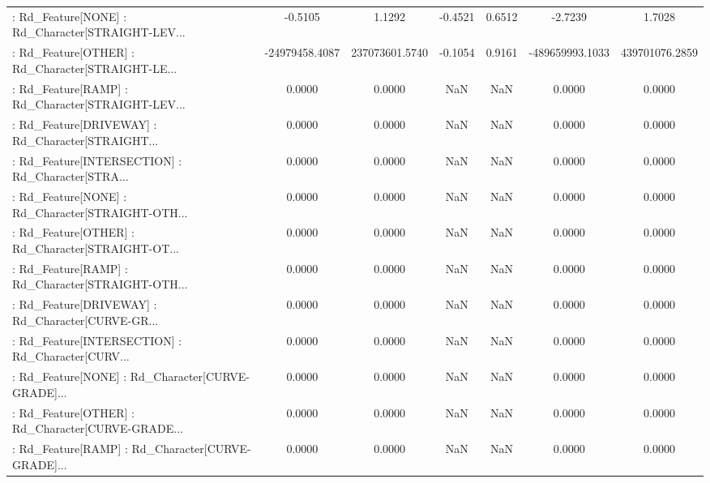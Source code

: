 \begin{longtable}{p{4cm}cccccc}
 : Rd\_Feature[NONE] : Rd\_Character[STRAIGHT-LEV... &           -0.5105 &            1.1292 & -0.4521 &       0.6512 &            -2.7239 &            1.7028 \\
 : Rd\_Feature[OTHER] : Rd\_Character[STRAIGHT-LE... &    -24979458.4087 &    237073601.5740 & -0.1054 &       0.9161 &    -489659993.1033 &    439701076.2859 \\
 : Rd\_Feature[RAMP] : Rd\_Character[STRAIGHT-LEV... &            0.0000 &            0.0000 &     NaN &          NaN &             0.0000 &            0.0000 \\
 : Rd\_Feature[DRIVEWAY] : Rd\_Character[STRAIGHT... &            0.0000 &            0.0000 &     NaN &          NaN &             0.0000 &            0.0000 \\
 : Rd\_Feature[INTERSECTION] : Rd\_Character[STRA... &            0.0000 &            0.0000 &     NaN &          NaN &             0.0000 &            0.0000 \\
 : Rd\_Feature[NONE] : Rd\_Character[STRAIGHT-OTH... &            0.0000 &            0.0000 &     NaN &          NaN &             0.0000 &            0.0000 \\
 : Rd\_Feature[OTHER] : Rd\_Character[STRAIGHT-OT... &            0.0000 &            0.0000 &     NaN &          NaN &             0.0000 &            0.0000 \\
 : Rd\_Feature[RAMP] : Rd\_Character[STRAIGHT-OTH... &            0.0000 &            0.0000 &     NaN &          NaN &             0.0000 &            0.0000 \\
 : Rd\_Feature[DRIVEWAY] : Rd\_Character[CURVE-GR... &            0.0000 &            0.0000 &     NaN &          NaN &             0.0000 &            0.0000 \\
 : Rd\_Feature[INTERSECTION] : Rd\_Character[CURV... &            0.0000 &            0.0000 &     NaN &          NaN &             0.0000 &            0.0000 \\
 : Rd\_Feature[NONE] : Rd\_Character[CURVE-GRADE]... &            0.0000 &            0.0000 &     NaN &          NaN &             0.0000 &            0.0000 \\
 : Rd\_Feature[OTHER] : Rd\_Character[CURVE-GRADE... &            0.0000 &            0.0000 &     NaN &          NaN &             0.0000 &            0.0000 \\
 : Rd\_Feature[RAMP] : Rd\_Character[CURVE-GRADE]... &            0.0000 &            0.0000 &     NaN &          NaN &             0.0000 &            0.0000 \\

\end{longtable}
